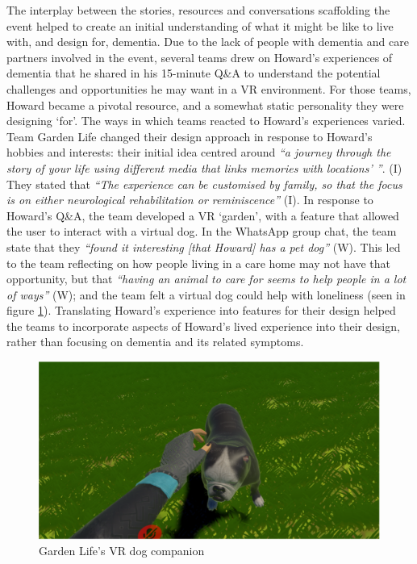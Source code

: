 The interplay between the stories, resources and conversations scaffolding the event helped to create an initial understanding of what it might be like to live with, and design for, dementia. Due to the lack of people with dementia and care partners involved in the event, several teams drew on Howard’s experiences of dementia that he shared in his 15-minute Q\&A to understand the potential challenges and opportunities he may want in a VR environment. For those teams, Howard became a pivotal resource, and a somewhat static personality they were designing `for'. The ways in which teams reacted to Howard’s experiences varied. Team Garden Life changed their design approach in response to Howard's hobbies and interests: their initial idea centred around \textit{``a journey through the story of your life using different media that links memories with locations' ''}. (I) They stated that \textit{``The experience can be customised by family, so that the focus is on either neurological rehabilitation or reminiscence''} (I). In response to Howard’s Q\&A, the team developed a VR `garden', with a feature that allowed the user to interact with a virtual dog. In the WhatsApp group chat, the team state that they \textit{``found it interesting [that Howard] has a pet dog''} (W). This led to the team reflecting on how people living in a care home may not have that opportunity, but that \textit{``having an animal to care for seems to help people in a lot of ways''} (W); and the team felt a virtual dog could help with loneliness (seen in figure \ref{fig:GardenLifeDog}). Translating Howard's experience into features for their design helped the teams to incorporate aspects of Howard's lived experience into their design, rather than focusing on dementia and its related symptoms. 

\begin{figure}[htp]
\centering
\includegraphics[width=.8\linewidth]{Images/DemVR/Findings/GadenLifeVR.png}
\caption{Garden Life's VR dog companion}
\label{fig:GardenLifeDog}
\end{figure}

